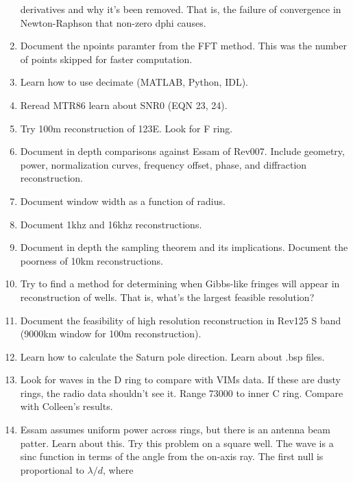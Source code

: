 \documentclass[crop=false,class=article,oneside]{standalone}
\begin{document}
\begin{enumerate}
                  derivatives and why it's been removed. That is,
                  the failure of convergence in Newton-Raphson that
                  non-zero dphi causes.
            \item Document the npoints paramter from the FFT method.
                  This was the number of points skipped for faster
                  computation.
            \item Learn how to use decimate (MATLAB, Python, IDL).
            \item Reread MTR86 learn about SNR0 (EQN 23, 24).
            \item Try 100m reconstruction of 123E. Look for F ring.
            \item Document in depth comparisons against Essam of Rev007.
                  Include geometry, power, normalization curves,
                  frequency offset, phase, and diffraction
                  reconstruction.
            \item Document window width as a function of radius.
            \item Document 1khz and 16khz reconstructions.
            \item Document in depth the sampling theorem and its
                  implications. Document the poorness of 10km
                  reconstructions.
            \item Try to find a method for determining when Gibbs-like
                  fringes will appear in reconstruction of wells. That is,
                  what's the largest feasible resolution?
            \item Document the feasibility of high resolution
                  reconstruction in Rev125 S band
                  (9000km window for 100m reconstruction).
            \item Learn how to calculate the Saturn pole direction.
                  Learn about .bsp files.
            \item Look for waves in the D ring to compare with VIMs data.
                  If these are dusty rings, the radio data shouldn't
                  see it. Range 73000 to inner C ring. Compare with
                  Colleen's results.
            \item Essam assumes uniform power across rings, but there is
                  an antenna beam patter. Learn about this. Try this
                  problem on a square well. The wave is a sinc function
                  in terms of the angle from the on-axis ray.
                  The first null is proportional to $\lambda/d$, where

\end{enumerate}
\end{document}
